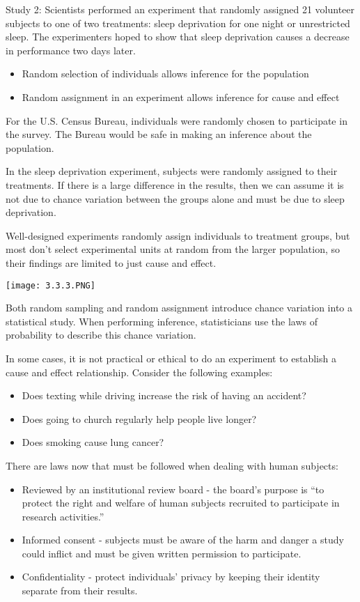 \documentclass[../stats.tex]{subfiles}
\begin{document}
Study 2: Scientists performed an experiment that randomly assigned 21 volunteer subjects to one of two treatments: sleep deprivation for one night or unrestricted sleep. The experimenters hoped to show that sleep deprivation causes a decrease in performance two days later.
\begin{itemize}
    \item Random selection of individuals allows inference for the population 
    \item Random assignment in an experiment allows inference for cause and effect 
\end{itemize}

For the U.S. Census Bureau, individuals were randomly chosen to participate in the survey. The Bureau would be safe in making an inference about the population.

In the sleep deprivation experiment, subjects were randomly assigned to their treatments. If there is a large difference in the results, then we can assume it is not due to chance variation 
between the groups alone and must be due to sleep deprivation.

Well-designed experiments randomly assign individuals to treatment groups, but most don't select experimental units at random from the larger population, so their findings are limited to just cause and effect.
\begin{center}
    \texttt{[image: 3.3.3.PNG]}
\end{center}

Both random sampling and random assignment introduce chance variation into a statistical study. When performing inference, statisticians use the laws of probability to describe this chance variation.

In some cases, it is not practical or ethical to do an experiment to establish a cause and effect relationship. Consider the following examples:
\begin{itemize}
    \item Does texting while driving increase the risk of having an accident?
    \item Does going to church regularly help people live longer?
    \item Does smoking cause lung cancer?
\end{itemize}

There are laws now that must be followed when dealing with human subjects:
\begin{itemize}
    \item Reviewed by an institutional review board - the board's purpose is ``to protect the right and welfare of human subjects recruited to participate in research activities.''
    \item Informed consent - subjects must be aware of the harm and danger a study could inflict and must be given written permission to participate.
    \item Confidentiality - protect individuals' privacy by keeping their identity separate from their results.
\end{itemize}
\end{document}
